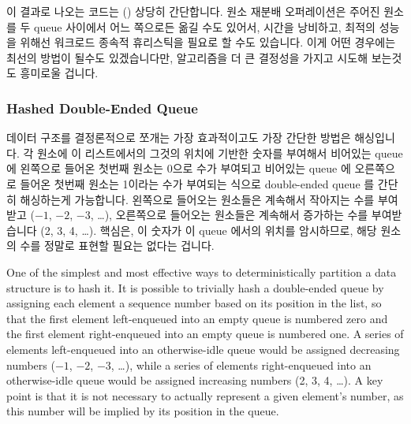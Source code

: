 이 결과로 나오는 코드는 () 상당히 간단합니다.
원소 재분배 오퍼레이션은 주어진 원소를 두 queue 사이에서 어느 쪽으로든 옮길
수도 있어서, 시간을 낭비하고, 최적의 성능을 위해선 워크로드 종속적 휴리스틱을
필요로 할 수도 있습니다.
이게 어떤 경우에는 최선의 방법이 될수도 있겠습니다만, 알고리즘을 더 큰 결정성을
가지고 시도해 보는것도 흥미로울 겁니다.

\subsubsection{Hashed Double-Ended Queue}
\label{sec:SMPdesign:Hashed Double-Ended Queue}

데이터 구조를 결정론적으로 쪼개는 가장 효과적이고도 가장 간단한 방법은
해싱입니다.
각 원소에 이 리스트에서의 그것의 위치에 기반한 숫자를 부여해서 비어있는 queue
에 왼쪽으로 들어온 첫번째 원소는 0으로 수가 부여되고 비어있는 queue 에
오른쪽으로 들어온 첫번째 원소는 1이라는 수가 부여되는 식으로 double-ended
queue 를 간단히 해싱하는게 가능합니다.
왼쪽으로 들어오는 원소들은 계속해서 작아지는 수를 부여받고 ($-1$, $-2$, $-3$,
\ldots), 오른쪽으로 들어오는 원소들은 계속해서 증가하는 수를 부여받습니다 (2,
3, 4, \ldots).
핵심은, 이 숫자가 이 queue 에서의 위치를 암시하므로, 해당 원소의 수를 정말로
표현할 필요는 없다는 겁니다.

\iffalse

One of the simplest and most effective ways to deterministically
partition a data structure is to hash it.
It is possible to trivially hash a double-ended queue by assigning
each element a sequence number based on its position in the list,
so that the first element left-enqueued into an empty queue is numbered
zero and the first element right-enqueued into an empty queue is numbered
one.
A series of elements left-enqueued into an otherwise-idle queue would
be assigned decreasing numbers ($-1$, $-2$, $-3$, \ldots), while a series of
elements right-enqueued into an otherwise-idle queue would be assigned
increasing numbers (2, 3, 4, \ldots).
A key point is that it is not necessary to actually represent a given
element's number, as this number will be implied by its position in
the queue.


